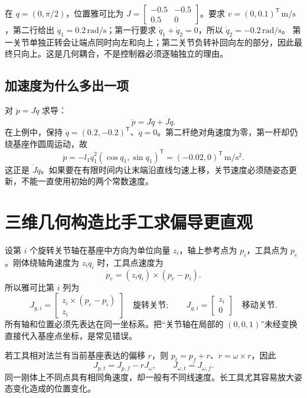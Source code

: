 \begin{examplebox}
在 $q=(0,\pi/2)$，位置雅可比为 $J=\begin{bmatrix}-0.5&-0.5\\0.5&0\end{bmatrix}$。要求 $v=(0,0.1)^\mathsf T\,\mathrm{m/s}$，第二行给出 $\dot q_1=0.2\,\mathrm{rad/s}$；第一行要求 $\dot q_1+\dot q_2=0$，所以 $\dot q_2=-0.2\,\mathrm{rad/s}$。
第一关节单独正转会让端点同时向左和向上；第二关节负转补回向左的部分，因此最终只向上。这是几何耦合，不是控制器必须逐轴独立的理由。
\end{examplebox}

\subsection{加速度为什么多出一项}
对 $\dot p=J\dot q$ 求导：
\begin{equation}
 \ddot p=J\ddot q+\dot J\dot q.
\end{equation}
在上例中，保持 $\dot q=(0.2,-0.2)^\mathsf T$、$\ddot q=0$。第二杆绝对角速度为零，第一杆却仍绕基座作圆周运动，故
\[
 \ddot p=-l_1\dot q_1^2(\cos q_1,\sin q_1)^\mathsf T
 =(-0.02,0)^\mathsf T\,\mathrm{m/s^2}.
\]
这正是 $\dot J\dot q$。如果要在有限时间内让末端沿直线匀速上移，关节速度必须随姿态更新，不能一直使用初始的两个常数速度。

\section{三维几何构造比手工求偏导更直观}
设第 $i$ 个旋转关节轴在基座中方向为单位向量 $z_i$，轴上参考点为 $p_i$，工具点为 $p_e$。刚体绕轴角速度为 $z_i\dot q_i$ 时，工具点速度为
\[
 \dot p_e=(z_i\dot q_i)\times(p_e-p_i).
\]
所以雅可比第 $i$ 列为
\begin{equation}
 J_{g,i}=\begin{bmatrix}z_i\times(p_e-p_i)\\z_i\end{bmatrix}
 \quad\text{旋转关节};\qquad
 J_{g,i}=\begin{bmatrix}z_i\\0\end{bmatrix}
 \quad\text{移动关节}.
\end{equation}
所有轴和位置必须先表达在同一坐标系。把“关节轴在局部的 $(0,0,1)$”未经变换直接代入基座点坐标，是常见错误。

若工具相对法兰有当前基座表达的偏移 $r$，则 $p_t=p_f+r$、$\dot r=\omega\times r$，因此
\begin{equation}
 J_{p,t}=J_{p,f}-\widehat rJ_\omega,
 \qquad J_{\omega,t}=J_{\omega,f}.
\end{equation}
同一刚体上不同点具有相同角速度，却一般有不同线速度。长工具尤其容易放大姿态变化造成的位置变化。

